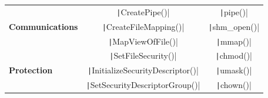 \documentclass{article}
\begin{document}
\begin{table}[H]
\begin{tabular}{l c c}
        \multirow{3}{*}{\textbf{Communications}}          & \texttt|CreatePipe()|                   & \texttt|pipe()|     \\
                                                          & \texttt|CreateFileMapping()|            & \texttt|shm_open()| \\
                                                          & \texttt|MapViewOfFile()|                & \texttt|mmap()|     \\[1em]

        \multirow{3}{*}{\textbf{Protection}}              & \texttt|SetFileSecurity()|              & \texttt|chmod()|    \\
                                                          & \texttt|InitializeSecurityDescriptor()| & \texttt|umask()|    \\
                                                          & \texttt|SetSecurityDescriptorGroup()|   & \texttt|chown()|    \\
        \bottomrule
    \end{tabular}
\end{table}
\end{document}
